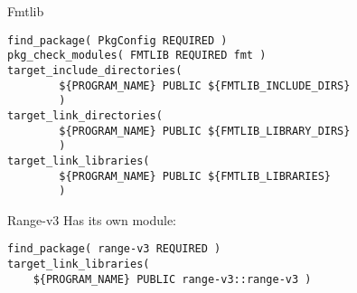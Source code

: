 \begin{numberedframe}{Fmtlib}
\begin{lstlisting}
find_package( PkgConfig REQUIRED )
pkg_check_modules( FMTLIB REQUIRED fmt )
target_include_directories(
        ${PROGRAM_NAME} PUBLIC ${FMTLIB_INCLUDE_DIRS}
        )
target_link_directories(
        ${PROGRAM_NAME} PUBLIC ${FMTLIB_LIBRARY_DIRS}
        )
target_link_libraries(
        ${PROGRAM_NAME} PUBLIC ${FMTLIB_LIBRARIES}
        )\end{lstlisting}
\end{numberedframe}

\begin{numberedframe}{Range-v3}
Has its own module:
\begin{lstlisting}
find_package( range-v3 REQUIRED )
target_link_libraries(
    ${PROGRAM_NAME} PUBLIC range-v3::range-v3 )
\end{lstlisting}
\end{numberedframe}




